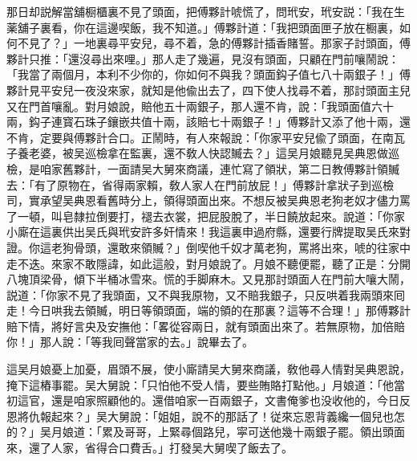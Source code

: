 那日却説解當舖橱櫃裏不見了頭面，把傅夥計唬慌了，問玳安，玳安説：「我在生薬舖子裏看，你在這邊喫飯，我不知道。」傅夥計道：「我把頭面匣子放在橱裏，如何不見了？」一地裏尋平安兒，尋不着，急的傅夥計插香賭誓。那家子討頭面，傅夥計只推：「還沒尋出來哩。」那人走了幾遍，見沒有頭面，只顧在門前嚷鬧說：「我當了兩個月，本利不少你的，你如何不與我？頭面鈎子值七八十兩銀子！」傅夥計見平安兒一夜没來家，就知是他偸出去了，四下使人找尋不着，那討頭面主兒又在門首嚷亂。對月娘說，賠他五十兩銀子，那人還不肯，說：「我頭面值六十兩，鈎子連寳石珠子鑲嵌共值十兩，該賠七十兩銀子！」傅夥計又添了他十兩，還不肯，定要與傅夥計合口。正鬧時，有人來報說：「你家平安兒偸了頭面，在南瓦子養老婆，被吴巡檢拿在監裏，還不敎人快認贓去？」這吴月娘聽見吴典恩做巡檢，是咱家舊夥計，一面請吴大舅來商議，連忙寫了領狀，第二日教傅夥計領贓去：「有了原物在，省得兩家賴，敎人家人在門前放屁！」傅夥計拿狀子到巡檢司，實承望吴典恩看舊時分上，領得頭面出來。不想反被吴典恩老狗老奴才儘力罵了一頓，叫皂隸拉倒要打，褪去衣裳，把屁股脫了，半日饒放起來。說道：「你家小廝在這裏供出吴氏與玳安許多奸情來！我這裏申過府縣，還要行牌提取吴氏來對證。你這老狗骨頭，還敢來領贓？」倒喫他千奴才萬老狗，罵將出來，唬的往家中走不迭。來家不敢隱諱，如此這般，對月娘說了。月娘不聽便罷，聽了正是：分開八塊頂梁骨，傾下半桶冰雪來。慌的手脚麻木。又見那討頭面人在門前大嚷大鬧，説道：「你家不見了我頭面，又不與我原物，又不賠我銀子，只反哄着我兩頭來囘走！今日哄我去領贓，明日等領頭面，端的領的在那裏？這等不合理！」那傅夥計賠下情，將好言央及安撫他：「畧從容兩日，就有頭面出來了。若無原物，加倍賠你！」那人說：「等我囘聲當家的去。」說畢去了。

這吴月娘憂上加憂，眉頭不展，使小廝請吴大舅來商議，敎他尋人情對吴典恩說，掩下這樁事罷。吴大舅說：「只怕他不受人情，要些賄賂打點他。」月娘道：「他當初這官，還是咱家照顧他的。還借咱家一百兩銀子，文書俺爹也没收他的，今日反恩將仇報起來？」吴大舅說：「姐姐，說不的那話了！従來忘恩背義纔一個兒也怎的？」吴月娘道：「累及哥哥，上緊尋個路兒，寜可送他幾十兩銀子罷。領出頭面來，還了人家，省得合口費舌。」打發吴大舅喫了飯去了。

